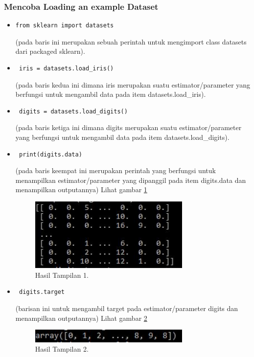 \subsubsection{Mencoba Loading an example Dataset}
\begin{itemize}
\item\begin{verbatim}from sklearn import datasets\end{verbatim}(pada baris ini merupakan sebuah perintah untuk mengimport class datasets dari packaged sklearn).
\item\begin{verbatim} iris = datasets.load_iris()\end{verbatim}(pada baris kedua ini dimana iris merupakan suatu estimator/parameter yang berfungsi untuk mengambil data pada item datasets.load\_iris).
\item\begin{verbatim} digits = datasets.load_digits()\end{verbatim}(pada baris ketiga ini dimana digits merupakan suatu estimator/parameter yang berfungsi untuk mengambil data pada item datasets.load\_digits).
\item\begin{verbatim} print(digits.data)\end{verbatim}(pada baris keempat ini merupakan perintah yang berfungsi untuk menampilkan estimator/parameter yang dipanggil pada item digits.data dan menampilkan outputannya) Lihat gambar \ref{10}
\begin{figure}[!htbp]\centerline{\includegraphics[width=0.75\textwidth]{figures/huda/10.JPG}}\caption{Hasil Tampilan 1.}\label{10}\end{figure}
\item\begin{verbatim} digits.target\end{verbatim}(barisan ini untuk mengambil target pada estimator/parameter digits dan menampilkan outputannya) Lihat gambar \ref{11}
\begin{figure}[!htbp]\centerline{\includegraphics[width=0.75\textwidth]{figures/huda/11.JPG}}\caption{Hasil Tampilan 2.}\label{11}\end{figure}

\end{itemize}
